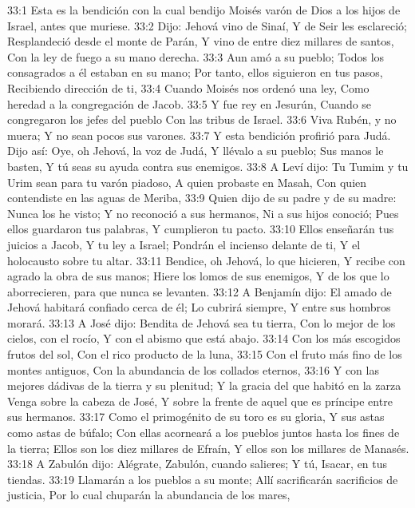 33:1 Esta es la bendición con la cual bendijo Moisés varón de Dios a los hijos de Israel, antes que muriese.  
33:2 Dijo:  
Jehová vino de Sinaí,  
Y de Seir les esclareció;  
Resplandeció desde el monte de Parán,  
Y vino de entre diez millares de santos,  
Con la ley de fuego a su mano derecha. 
33:3 Aun amó a su pueblo;  
Todos los consagrados a él estaban en su mano;  
Por tanto, ellos siguieron en tus pasos,  
Recibiendo dirección de ti,  
33:4 Cuando Moisés nos ordenó una ley,  
Como heredad a la congregación de Jacob.  
33:5 Y fue rey en Jesurún,  
Cuando se congregaron los jefes del pueblo  
Con las tribus de Israel.  
33:6 Viva Rubén, y no muera;  
Y no sean pocos sus varones.  
33:7 Y esta bendición profirió para Judá. Dijo así:  
Oye, oh Jehová, la voz de Judá,  
Y llévalo a su pueblo;  
Sus manos le basten,  
Y tú seas su ayuda contra sus enemigos.  
33:8 A Leví dijo:  
Tu Tumim y tu Urim sean para tu varón piadoso,  
A quien probaste en Masah, 
Con quien contendiste en las aguas de Meriba, 
33:9 Quien dijo de su padre y de su madre: Nunca los he visto; 
Y no reconoció a sus hermanos,  
Ni a sus hijos conoció;  
Pues ellos guardaron tus palabras,  
Y cumplieron tu pacto.  
33:10 Ellos enseñarán tus juicios a Jacob,  
Y tu ley a Israel;  
Pondrán el incienso delante de ti,  
Y el holocausto sobre tu altar.  
33:11 Bendice, oh Jehová, lo que hicieren,  
Y recibe con agrado la obra de sus manos;  
Hiere los lomos de sus enemigos,  
Y de los que lo aborrecieren, para que nunca se levanten.  
33:12 A Benjamín dijo:  
El amado de Jehová habitará confiado cerca de él;  
Lo cubrirá siempre,  
Y entre sus hombros morará. 
33:13 A José dijo:  
Bendita de Jehová sea tu tierra,  
Con lo mejor de los cielos, con el rocío,  
Y con el abismo que está abajo.  
33:14 Con los más escogidos frutos del sol,  
Con el rico producto de la luna,  
33:15 Con el fruto más fino de los montes antiguos,  
Con la abundancia de los collados eternos,  
33:16 Y con las mejores dádivas de la tierra y su plenitud;  
Y la gracia del que habitó en la zarza  
Venga sobre la cabeza de José,  
Y sobre la frente de aquel que es príncipe entre sus hermanos.  
33:17 Como el primogénito de su toro es su gloria,  
Y sus astas como astas de búfalo;  
Con ellas acorneará a los pueblos juntos hasta los fines de la tierra;  
Ellos son los diez millares de Efraín,  
Y ellos son los millares de Manasés. 
33:18 A Zabulón dijo:  
Alégrate, Zabulón, cuando salieres;  
Y tú, Isacar, en tus tiendas.  
33:19 Llamarán a los pueblos a su monte;  
Allí sacrificarán sacrificios de justicia,  
Por lo cual chuparán la abundancia de los mares,  
